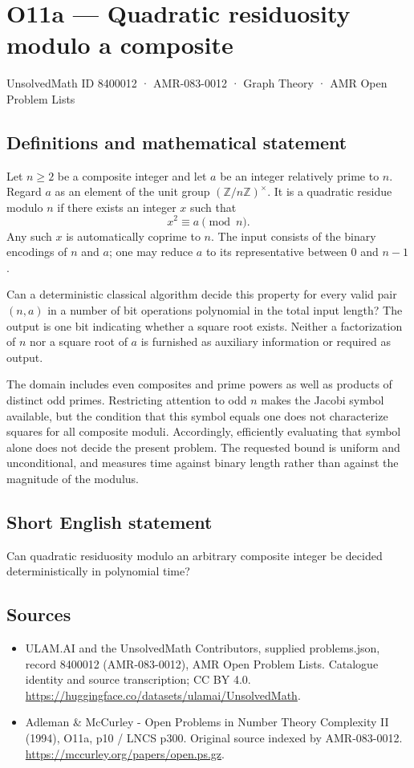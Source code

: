 \documentclass[11pt,a4paper]{article}
\begin{document}
\section*{O11a — Quadratic residuosity modulo a composite}\label{8400012}
{\small UnsolvedMath ID 8400012 · AMR-083-0012 · Graph Theory · AMR Open Problem Lists}
\subsection{Definitions and mathematical statement}
Let $n\ge2$ be a composite integer and let $a$ be an integer relatively prime to $n$. Regard $a$ as an element of the unit group $(\mathbb Z/n\mathbb Z)^\times$. It is a quadratic residue modulo $n$ if there exists an integer $x$ such that
\[
x^2\equiv a\pmod n.
\]
Any such $x$ is automatically coprime to $n$. The input consists of the binary encodings of $n$ and $a$; one may reduce $a$ to its representative between $0$ and $n-1$.

Can a deterministic classical algorithm decide this property for every valid pair $(n,a)$ in a number of bit operations polynomial in the total input length? The output is one bit indicating whether a square root exists. Neither a factorization of $n$ nor a square root of $a$ is furnished as auxiliary information or required as output.

The domain includes even composites and prime powers as well as products of distinct odd primes. Restricting attention to odd $n$ makes the Jacobi symbol available, but the condition that this symbol equals one does not characterize squares for all composite moduli. Accordingly, efficiently evaluating that symbol alone does not decide the present problem. The requested bound is uniform and unconditional, and measures time against binary length rather than against the magnitude of the modulus.
\subsection{Short English statement}
Can quadratic residuosity modulo an arbitrary composite integer be decided deterministically in polynomial time?
\subsection{Sources}
\begin{itemize}
\item[S1] ULAM.AI and the UnsolvedMath Contributors, supplied problems.json, record 8400012 (AMR-083-0012), AMR Open Problem Lists. Catalogue identity and source transcription; CC BY 4.0.
\url{https://huggingface.co/datasets/ulamai/UnsolvedMath}.
\item[S2] Adleman \& McCurley - Open Problems in Number Theory Complexity II (1994), O11a, p10 / LNCS p300. Original source indexed by AMR-083-0012.
\url{https://mccurley.org/papers/open.ps.gz}.
\end{itemize}
\end{document}
